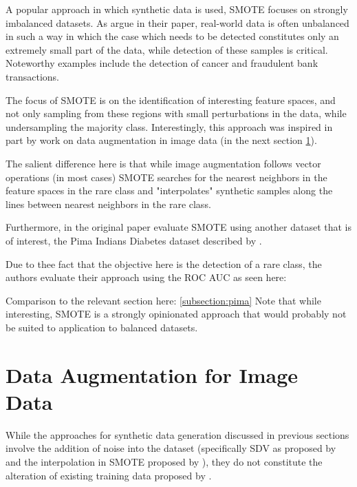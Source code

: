 A popular approach in which synthetic data is used, \ac{SMOTE} focuses on strongly imbalanced datasets. As \cite{smote} argue in their paper, real-world data is often unbalanced in such a way in which the case which needs to be detected constitutes only an extremely small part of the data, while detection of these samples is critical. Noteworthy examples include the detection of cancer and fraudulent bank transactions.

The focus of \ac{SMOTE} is on the identification of interesting feature spaces, and not only sampling from these regions with small perturbations in the data, while undersampling the majority class. 
Interestingly, this approach was inspired in part by work on data augmentation in image data (in the next section \ref{section:image_augmentation}).

The salient difference here is that while image augmentation follows vector operations (in most cases) \ac{SMOTE} searches for the nearest neighbors in the feature spaces in the rare class and "interpolates" synthetic samples along the lines between nearest neighbors in the rare class.

Furthermore, in the original paper \cite{smote} evaluate \ac{SMOTE} using another dataset that is of interest, the Pima Indians Diabetes dataset described by \cite{diabetes}.

\pagebreak

Due to thee fact that the objective here is the detection of a rare class, the authors evaluate their approach using the \ac{ROC} \ac{AUC} as seen here:


Comparison to the relevant section here: \ref{subsection:pima}
Note that while interesting, \ac{SMOTE} is a strongly opinionated approach that would probably not be suited to application to balanced datasets.

\clearpage

\section{Data Augmentation for Image Data}
\label{section:image_augmentation}

While the approaches for synthetic data generation discussed in previous sections involve the addition of noise into the dataset (specifically \ac{SDV} as proposed by \cite{patki2016synthetic} and the interpolation in \ac{SMOTE} proposed by \cite{smote}), they do not constitute the alteration of existing training data proposed by \cite{image_augmentation}.


